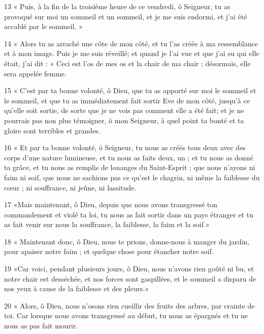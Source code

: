 \par 13 « Puis, à la fin de la troisième heure de ce vendredi, ô Seigneur, tu as provoqué sur moi un sommeil et un sommeil, et je me suis endormi, et j'ai été accablé par le sommeil. »

\par 14 « Alors tu as arraché une côte de mon côté, et tu l'as créée à ma ressemblance et à mon image. Puis je me suis réveillé; et quand je l'ai vue et que j'ai su qui elle était, j'ai dit : « Ceci est l'os de mes os et la chair de ma chair ; désormais, elle sera appelée femme.

\par 15 « C'est par ta bonne volonté, ô Dieu, que tu as apporté sur moi le sommeil et le sommeil, et que tu as immédiatement fait sortir Eve de mon côté, jusqu'à ce qu'elle soit sortie, de sorte que je ne vois pas comment elle a été fait; et je ne pourrais pas non plus témoigner, ô mon Seigneur, à quel point ta bonté et ta gloire sont terribles et grandes.

\par 16 « Et par ta bonne volonté, ô Seigneur, tu nous as créés tous deux avec des corps d'une nature lumineuse, et tu nous as faits deux, un ; et tu nous as donné ta grâce, et tu nous as remplis de louanges du Saint-Esprit ; que nous n'ayons ni faim ni soif, que nous ne sachions pas ce qu'est le chagrin, ni même la faiblesse du cœur ; ni souffrance, ni jeûne, ni lassitude.

\par 17 «Mais maintenant, ô Dieu, depuis que nous avons transgressé ton commandement et violé ta loi, tu nous as fait sortir dans un pays étranger et tu as fait venir sur nous la souffrance, la faiblesse, la faim et la soif.»

\par 18 « Maintenant donc, ô Dieu, nous te prions, donne-nous à manger du jardin, pour apaiser notre faim ; et quelque chose pour étancher notre soif.

\par 19 «Car voici, pendant plusieurs jours, ô Dieu, nous n'avons rien goûté ni bu, et notre chair est desséchée, et nos forces sont gaspillées, et le sommeil a disparu de nos yeux à cause de la faiblesse et des pleurs.»

\par 20 « Alors, ô Dieu, nous n'osons rien cueillir des fruits des arbres, par crainte de toi. Car lorsque nous avons transgressé au début, tu nous as épargnés et tu ne nous as pas fait mourir.

